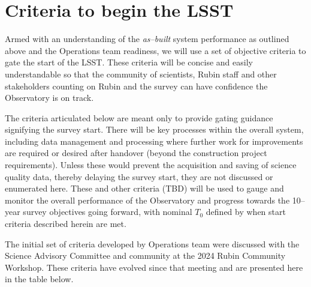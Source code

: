 \section{Criteria to begin the LSST}

Armed with an understanding of the {\it as--built} system performance as outlined above and the Operations team readiness, we will use a set of objective criteria to gate the start of the LSST. These criteria will be concise and easily understandable so that the community of scientists, Rubin staff and other stakeholders counting on Rubin and the survey can have confidence the Observatory is on track.

The criteria articulated below are meant only to provide gating guidance signifying the survey start. There will be key processes within the overall system, including data management and processing where further work for improvements are required or desired after handover (beyond the construction project requirements). Unless these would prevent the acquisition and saving of science quality data, thereby delaying the survey start, they are not discussed or enumerated here.  These and other criteria (TBD) will be used to gauge and monitor the overall performance of the Observatory and progress towards the 10--year survey objectives going forward, with nominal $T_0$ defined by when start criteria described herein are met.

The initial set of criteria developed by Operations team were discussed with the Science Advisory Committee and community at the 2024 Rubin Community Workshop. These criteria have evolved since that meeting and are presented here in the table below.

